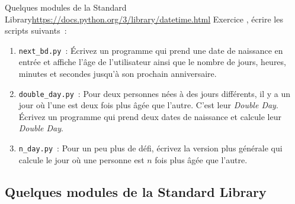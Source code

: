 \documentclass{beamer}
\begin{document}
    \begin{frame}{Quelques modules de la Standard Library}{\href{datetime}{https://docs.python.org/3/library/datetime.html}}
        Exercice \execcounterdispinc, écrire les scripts suivants{}~:
        \begin{enumerate}
            \item \lstinline{next_bd.py}~: Écrivez un programme qui prend une date de naissance en entrée et affiche l'âge de l'utilisateur ainsi que le nombre de jours, heures, minutes et secondes jusqu'à son prochain anniversaire.
            \item \lstinline{double_day.py}~: Pour deux personnes nées à des jours différents, il y a un jour où l'une est deux fois plus âgée que l'autre. C'est leur \textit{Double Day}.
            Écrivez un programme qui prend deux dates de naissance et calcule leur \textit{Double Day}.
            \item \lstinline{n_day.py}~: Pour un peu plus de défi, écrivez la version plus générale qui calcule le jour où une personne est $n$ fois plus âgée que l'autre.
        \end{enumerate}
    \end{frame}

    \subsection{Quelques modules de la Standard Library}\label{subsec:std-modules}
\end{document}
